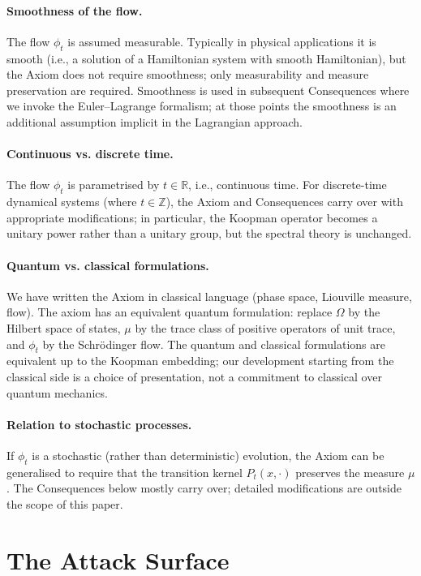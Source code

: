 \documentclass[11pt,twocolumn,a4paper]{article}
\theoremstyle{axiomstyle}
\theoremstyle{conseqstyle}
\theoremstyle{definition}
\theoremstyle{remark}
\newcommand{\Real}{\mathbb{R}}
\newcommand{\Integer}{\mathbb{Z}}
\begin{document}
\paragraph{Smoothness of the flow.} The flow $\phi_{t}$ is assumed measurable. Typically in physical applications it is smooth (i.e., a solution of a Hamiltonian system with smooth Hamiltonian), but the Axiom does not require smoothness; only measurability and measure preservation are required. Smoothness is used in subsequent Consequences where we invoke the Euler--Lagrange formalism; at those points the smoothness is an additional assumption implicit in the Lagrangian approach.

\paragraph{Continuous vs. discrete time.} The flow $\phi_{t}$ is parametrised by $t\in\Real$, i.e., continuous time. For discrete-time dynamical systems (where $t\in\Integer$), the Axiom and Consequences carry over with appropriate modifications; in particular, the Koopman operator becomes a unitary power rather than a unitary group, but the spectral theory is unchanged.

\paragraph{Quantum vs. classical formulations.} We have written the Axiom in classical language (phase space, Liouville measure, flow). The axiom has an equivalent quantum formulation: replace $\Omega$ by the Hilbert space of states, $\mu$ by the trace class of positive operators of unit trace, and $\phi_{t}$ by the Schr\"odinger flow. The quantum and classical formulations are equivalent up to the Koopman embedding; our development starting from the classical side is a choice of presentation, not a commitment to classical over quantum mechanics.

\paragraph{Relation to stochastic processes.} If $\phi_{t}$ is a stochastic (rather than deterministic) evolution, the Axiom can be generalised to require that the transition kernel $P_{t}(x,\cdot)$ preserves the measure $\mu$. The Consequences below mostly carry over; detailed modifications are outside the scope of this paper.

\section{The Attack Surface}
\label{sec:attack}
\end{document}
